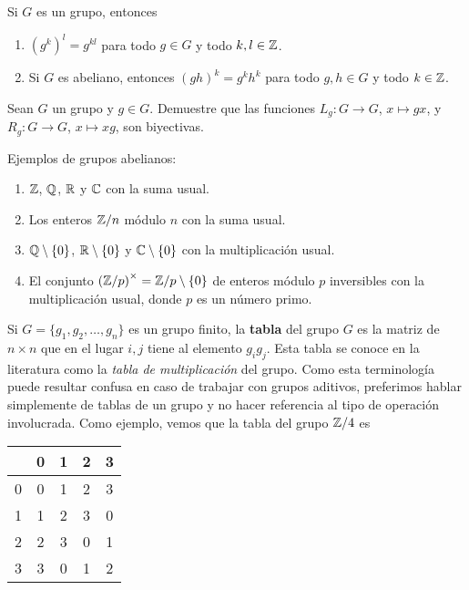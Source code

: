 \begin{exercise}
	Si $G$ es un grupo, entonces
	\begin{enumerate}
		\item $(g^k)^l=g^{kl}$ para todo $g\in G$ y todo $k,l\in\mathbb{Z}$. 
		\item Si $G$ es abeliano, entonces $(gh)^k=g^kh^k$ para todo $g,h\in G$
			y todo $k\in\mathbb{Z}$. 
	\end{enumerate}
\end{exercise}

\begin{exercise}
	Sean $G$ un grupo y $g\in G$. Demuestre que las funciones $L_g\colon G\to
	G$, $x\mapsto gx$, y $R_g\colon G\to G$, $x\mapsto xg$, son biyectivas.
\end{exercise}

\begin{examples}
	Ejemplos de grupos abelianos:
	\begin{enumerate}
		\item $\mathbb{Z}$, $\mathbb{Q}$, $\mathbb{R}$ y $\mathbb{C}$ con la suma usual.
		\item Los enteros $\mathbb{Z}/n$ módulo $n$ con la suma usual.
		\item $\mathbb{Q}\setminus\{0\}$, $\mathbb{R}\setminus\{0\}$ y $\mathbb{C}\setminus\{0\}$ con
			la multiplicación usual. 
		\item El conjunto $\left(\mathbb{Z}/p\right)^\times=\mathbb{Z}/p\setminus\{0\}$ de enteros módulo $p$ inversibles con la multiplicación usual, donde
			$p$ es un número primo. 
	\end{enumerate}
\end{examples}

Si $G=\{g_1,g_2,\dots,g_n\}$ es un grupo finito, la \textbf{tabla}  
del grupo $G$ es la matriz de $n\times n$ que en el lugar 
$i,j$ tiene al elemento $g_ig_j$. Esta tabla se conoce en la literatura como la \emph{tabla de multiplicación} del grupo. 
Como esta terminología puede resultar confusa en caso de trabajar con grupos aditivos, preferimos hablar simplemente
de tablas de un grupo y no hacer referencia al tipo de operación involucrada. Como ejemplo, 
vemos que la tabla del grupo
$\mathbb{Z}/4$ es
\begin{center}
  \begin{tabular}{l|cccc}
     &0&1&2&3 \\
    \hline
    0 & 0 & 1 & 2 & 3\\
    1 & 1 & 2 & 3 & 0\\
    2 & 2 & 3 & 0 & 1\\
    3 & 3 & 0 & 1 & 2
  \end{tabular}
\end{center}

